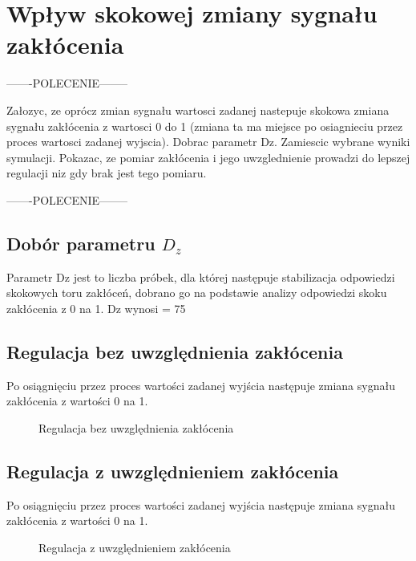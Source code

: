 \section{Wpływ skokowej zmiany sygnału zakłócenia}
\label{projekt:zad5}
-------POLECENIE--------

Załozyc, ze oprócz zmian sygnału wartosci zadanej nastepuje skokowa zmiana sygnału
zakłócenia z wartosci 0 do 1 (zmiana ta ma miejsce po osiagnieciu przez proces wartosci
zadanej wyjscia). Dobrac parametr Dz. Zamiescic wybrane wyniki symulacji. Pokazac,
ze pomiar zakłócenia i jego uwzglednienie prowadzi do lepszej regulacji niz gdy brak
jest tego pomiaru.

-------POLECENIE--------



\subsection{Dobór parametru $D_z$}
\label{projekt:zad5:Dz}

Parametr Dz jest to liczba próbek, dla której następuje stabilizacja odpowiedzi skokowych toru zakłóceń, 
dobrano go na podstawie analizy odpowiedzi skoku
zakłócenia z 0 na 1.
Dz wynosi = 75

\subsection{Regulacja bez uwzględnienia zakłócenia}
\label{projekt:zad5:regulacjaBezUwzg}

Po osiągnięciu przez proces wartości zadanej wyjścia następuje zmiana sygnału
zakłócenia z wartości 0 na 1.

\begin{figure}[H] 
    \centering
    
    \caption{Regulacja bez uwzględnienia zakłócenia}
    \label{projekt:zad5:regulacjaBezUwzgZ:figure}
\end{figure}

\subsection{Regulacja z uwzględnieniem zakłócenia}
\label{projekt:zad5:regulacjaZUwzg}

Po osiągnięciu przez proces wartości zadanej wyjścia następuje zmiana sygnału
zakłócenia z wartości 0 na 1.

\begin{figure}[H] 
    \centering
    
    \caption{Regulacja z uwzględnieniem zakłócenia}
    \label{projekt:zad5:regulacjaUwzgZ:figure}
\end{figure}

